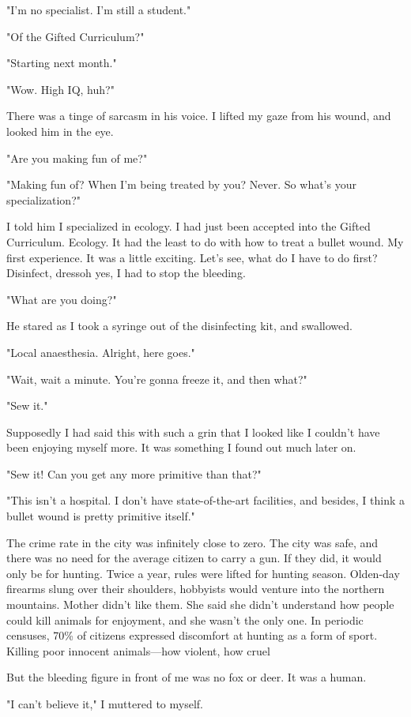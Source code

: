 "I'm no specialist. I'm still a student."

"Of the Gifted Curriculum?"

"Starting next month."

"Wow. High IQ, huh?"

There was a tinge of sarcasm in his voice. I lifted my gaze from his
wound, and looked him in the eye.

"Are you making fun of me?"

"Making fun of? When I'm being treated by you? Never. So what's your
specialization?"

I told him I specialized in ecology. I had just been accepted into the
Gifted Curriculum. Ecology. It had the least to do with how to treat a
bullet wound. My first experience. It was a little exciting. Let's see,
what do I have to do first? Disinfect, dress\el oh yes, I had to stop
the bleeding.

"What are you doing?"

He stared as I took a syringe out of the disinfecting kit, and
swallowed.

"Local anaesthesia. Alright, here goes."

"Wait, wait a minute. You're gonna freeze it, and then what?"

"Sew it."

Supposedly I had said this with such a grin that I looked like I
couldn't have been enjoying myself more. It was something I found out
much later on.

"Sew it! Can you get any more primitive than that?"

"This isn't a hospital. I don't have state-of-the-art facilities, and
besides, I think a bullet wound is pretty primitive itself."

The crime rate in the city was infinitely close to zero. The city was
safe, and there was no need for the average citizen to carry a gun. If
they did, it would only be for hunting. Twice a year, rules were lifted
for hunting season. Olden-day firearms slung over their shoulders,
hobbyists would venture into the northern mountains. Mother didn't like
them. She said she didn't understand how people could kill animals for
enjoyment, and she wasn't the only one. In periodic censuses, 70\% of
citizens expressed discomfort at hunting as a form of sport. Killing
poor innocent animals---how violent, how cruel\el 

But the bleeding figure in front of me was no fox or deer. It was a
human.

"I can't believe it," I muttered to myself.

